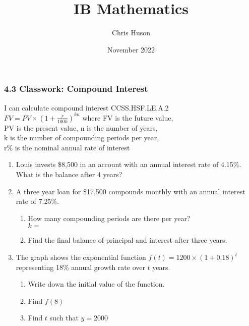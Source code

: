 \documentclass[12pt, twoside]{article}
\title{IB Mathematics}
\author{Chris Huson}
\date{November 2022} %
\begin{document}
\subsubsection*{4.3 Classwork: Compound Interest}
I can calculate compound interest \hfill CCSS.HSF.LE.A.2 \\[0.5cm]
$\displaystyle FV=PV \times \left(1+\frac{r}{100k} \right)^{kn}$
where FV is the future value,\\[0.25cm]
PV is the present value, n is the number of years, \\
 k is the number of compounding periods per year, \\
 r\% is the nominal annual rate of interest

\begin{enumerate}
\item Louis invests \$8,500 in an account with an annual interest rate of 4.15\%. What is the balance after 4 years? \vspace{2cm}

\item A three year loan for \$17,500 compounds monthly with an annual interest rate of 7.25\%.
\begin{enumerate}[itemsep=0.5cm]
    \item How many compounding periods are there per year? \\[0.25cm]
    $k=$
    \item Find the final balance of principal and interest after three years.
\end{enumerate} \vspace{2cm}

\item The graph shows the exponential function $\displaystyle f(t)=1200 \times \left( 1+0.18 \right)^t$ representing 18\% annual growth rate over $t$ years.
\begin{multicols}{2}
    \begin{enumerate}[itemsep=1cm]
        \item Write down the initial value of the function.
        \item Find $f(8)$
        \item Find $t$ such that $y=2000$
    \end{enumerate}
    \begin{center}
\end{center}
\end{multicols}
\end{enumerate}
\end{document}
